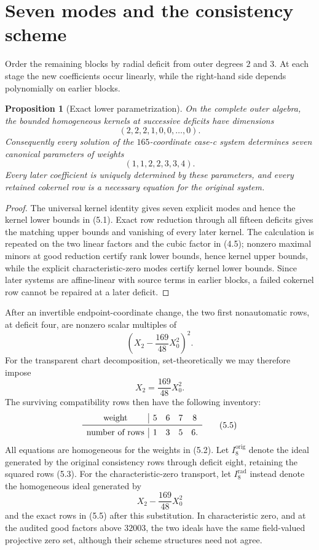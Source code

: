 \documentclass[11pt]{article}
\newtheorem{proposition}[theorem]{Proposition}
\theoremstyle{definition}
\theoremstyle{remark}
\begin{document}
\section{Seven modes and the consistency scheme}\label{sec:modes}

Order the remaining blocks by radial deficit from outer degrees \(2\)
and \(3\).  At each stage the new coefficients occur linearly, while the
right-hand side depends polynomially on earlier blocks.

\begin{proposition}[Exact lower parametrization]\label{prop:modes}
On the complete outer algebra, the bounded homogeneous kernels at
successive deficits have dimensions
\[
   (2,2,2,1,0,0,\ldots,0).                              \tag{5.1}
\]
Consequently every solution of the \(165\)-coordinate case-c system
determines seven canonical parameters of weights
\[
   (1,1,2,2,3,3,4).                                    \tag{5.2}
\]
Every later coefficient is uniquely determined by these parameters, and
every retained cokernel row is a necessary equation for the original
system.
\end{proposition}

\begin{proof}
The universal kernel identity gives seven explicit modes and hence the
kernel lower bounds in (5.1).  Exact row reduction through all fifteen
deficits gives the matching upper bounds and vanishing of every later
kernel.  The calculation is repeated on the two linear factors and the
cubic factor in (4.5); nonzero maximal minors at good reduction certify
rank lower bounds, hence kernel upper bounds, while the explicit
characteristic-zero modes certify kernel lower bounds.  Since later
systems are affine-linear with source terms in earlier blocks, a failed
cokernel row cannot be repaired at a later deficit.
\end{proof}

After an invertible endpoint-coordinate change, the two first
nonautomatic rows, at deficit four, are nonzero scalar multiples of
\[
   \left(X_2-\frac{169}{48}X_0^2\right)^2.              \tag{5.3}
\]
For the transparent chart decomposition, set-theoretically we may
therefore impose
\[
   X_2=\frac{169}{48}X_0^2.                             \tag{5.4}
\]
The surviving compatibility rows then have the following inventory:
\[
\begin{array}{c|cccc}
\text{weight}&5&6&7&8\\ \midrule
\text{number of rows}&1&3&5&6.
\end{array}                                             \tag{5.5}
\]
All equations are homogeneous for the weights in (5.2).  Let
\(I_8^{\mathrm{orig}}\) denote the ideal generated by the original
consistency rows through deficit eight, retaining the squared rows (5.3).
For the characteristic-zero transport, let
\(I_8^{\mathrm{rad}}\) instead denote the homogeneous ideal generated by
\[
 X_2-\frac{169}{48}X_0^2
\]
and the exact rows in (5.5) after this substitution.  In characteristic
zero, and at the audited good factors above \(32003\), the two ideals
have the same field-valued projective zero set, although their scheme
structures need not agree.
\end{document}
